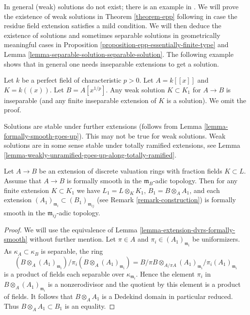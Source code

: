 \noindent
In general (weak) solutions do not exist; there is an example in \cite{Epp}.
We will prove the existence of weak solutions in Theorem \ref{theorem-epp}
following \cite{Epp} in case the residue field extension satisfies a
mild condition. We will then deduce the existence of solutions
and sometimes separable solutions in geometrically meaningful cases in
Proposition \ref{proposition-epp-essentially-finite-type}
and Lemma \ref{lemma-separable-solution-separable-solution}.
The following example shows that
in general one needs inseparable extensions to get a solution.

\begin{example}
\label{example-inseparable-necessary}
Let $k$ be a perfect field of characteristic $p > 0$. Let $A = k[[x]]$
and $K = k((x))$. Let $B = A[x^{1/p}]$. Any weak solution $K \subset K_1$
for $A \to B$ is inseparable (and any finite inseparable extension of
$K$ is a solution). We omit the proof.
\end{example}

\noindent
Solutions are stable under further extensions
(follows from Lemma \ref{lemma-formally-smooth-goes-up}).
This may not be true for weak solutions.
Weak solutions are in some sense stable under totally ramified extensions, see
Lemma \ref{lemma-weakly-unramified-goes-up-along-totally-ramified}.

\begin{lemma}
\label{lemma-formally-smooth-goes-up}
Let $A \to B$ be an extension of discrete valuation rings with fraction fields
$K \subset L$. Assume that $A \to B$ is formally smooth in the
$\mathfrak m_B$-adic topology. Then for any finite extension $K \subset K_1$
we have $L_1 = L \otimes_K K_1$, $B_1 = B \otimes_A A_1$, and each extension
$(A_1)_{\mathfrak m_i} \subset (B_1)_{\mathfrak m_{ij}}$ (see
Remark \ref{remark-construction}) is formally smooth in the
$\mathfrak m_{ij}$-adic topology.
\end{lemma}

\begin{proof}
We will use the equivalence of Lemma \ref{lemma-extension-dvrs-formally-smooth}
without further mention. Let $\pi \in A$ and $\pi_i \in (A_1)_{\mathfrak m_i}$
be uniformizers. As $\kappa_A \subset \kappa_B$ is separable, the ring
$$
(B \otimes_A (A_1)_{\mathfrak m_i})/\pi_i (B \otimes_A (A_1)_{\mathfrak m_i}) =
B/\pi B \otimes_{A/\pi A} (A_1)_{\mathfrak m_i}/\pi_i (A_1)_{\mathfrak m_i}
$$
is a product of fields each separable over $\kappa_{\mathfrak m_i}$.
Hence the element $\pi_i$ in $B \otimes_A (A_1)_{\mathfrak m_i}$
is a nonzerodivisor and the quotient by this element is a product of fields.
It follows that $B \otimes_A A_1$ is a Dedekind domain in particular
reduced. Thus $B \otimes_A A_1 \subset B_1$ is an equality.
\end{proof}

